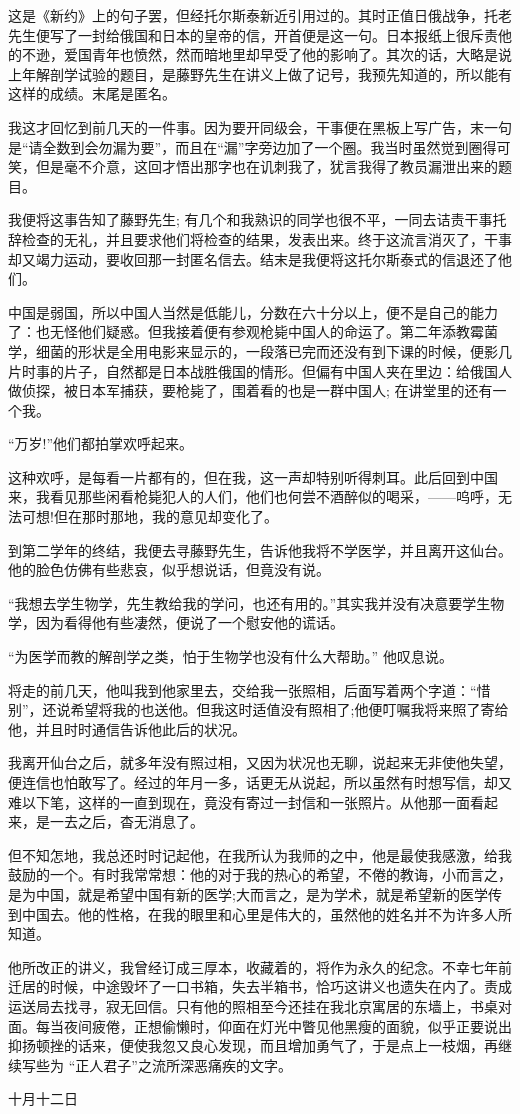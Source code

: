     这是《新约》上的句子罢，但经托尔斯泰新近引用过的。其时正值日俄战争，托老先生便写了一封给俄国和日本的皇帝的信，开首便是这一句。日本报纸上很斥责他的不逊，爱国青年也愤然，然而暗地里却早受了他的影响了。其次的话，大略是说上年解剖学试验的题目，是藤野先生在讲义上做了记号，我预先知道的，所以能有这样的成绩。末尾是匿名。

    我这才回忆到前几天的一件事。因为要开同级会，干事便在黑板上写广告，末一句是“请全数到会勿漏为要”，而且在“漏”字旁边加了一个圈。我当时虽然觉到圈得可笑，但是毫不介意，这回才悟出那字也在讥刺我了，犹言我得了教员漏泄出来的题目。

    我便将这事告知了藤野先生; 有几个和我熟识的同学也很不平，一同去诘责干事托辞检查的无礼，并且要求他们将检查的结果，发表出来。终于这流言消灭了，干事却又竭力运动，要收回那一封匿名信去。结末是我便将这托尔斯泰式的信退还了他们。

    中国是弱国，所以中国人当然是低能儿，分数在六十分以上，便不是自己的能力了：也无怪他们疑惑。但我接着便有参观枪毙中国人的命运了。第二年添教霉菌学，细菌的形状是全用电影来显示的，一段落已完而还没有到下课的时候，便影几片时事的片子，自然都是日本战胜俄国的情形。但偏有中国人夹在里边：给俄国人做侦探，被日本军捕获，要枪毙了，围着看的也是一群中国人; 在讲堂里的还有一个我。

    “万岁!”他们都拍掌欢呼起来。

    这种欢呼，是每看一片都有的，但在我，这一声却特别听得刺耳。此后回到中国来，我看见那些闲看枪毙犯人的人们，他们也何尝不酒醉似的喝采，——呜呼，无法可想!但在那时那地，我的意见却变化了。

    到第二学年的终结，我便去寻藤野先生，告诉他我将不学医学，并且离开这仙台。他的脸色仿佛有些悲哀，似乎想说话，但竟没有说。

    “我想去学生物学，先生教给我的学问，也还有用的。”其实我并没有决意要学生物学，因为看得他有些凄然，便说了一个慰安他的谎话。

    “为医学而教的解剖学之类，怕于生物学也没有什么大帮助。” 他叹息说。

    将走的前几天，他叫我到他家里去，交给我一张照相，后面写着两个字道：“惜别”，还说希望将我的也送他。但我这时适值没有照相了;他便叮嘱我将来照了寄给他，并且时时通信告诉他此后的状况。

    我离开仙台之后，就多年没有照过相，又因为状况也无聊，说起来无非使他失望，便连信也怕敢写了。经过的年月一多，话更无从说起，所以虽然有时想写信，却又难以下笔，这样的一直到现在，竟没有寄过一封信和一张照片。从他那一面看起来，是一去之后，杳无消息了。

    但不知怎地，我总还时时记起他，在我所认为我师的之中，他是最使我感激，给我鼓励的一个。有时我常常想：他的对于我的热心的希望，不倦的教诲，小而言之，是为中国，就是希望中国有新的医学;大而言之，是为学术，就是希望新的医学传到中国去。他的性格，在我的眼里和心里是伟大的，虽然他的姓名并不为许多人所知道。

    他所改正的讲义，我曾经订成三厚本，收藏着的，将作为永久的纪念。不幸七年前迁居的时候，中途毁坏了一口书箱，失去半箱书，恰巧这讲义也遗失在内了。责成运送局去找寻，寂无回信。只有他的照相至今还挂在我北京寓居的东墙上，书桌对面。每当夜间疲倦，正想偷懒时，仰面在灯光中瞥见他黑瘦的面貌，似乎正要说出抑扬顿挫的话来，便使我忽又良心发现，而且增加勇气了，于是点上一枝烟，再继续写些为 “正人君子”之流所深恶痛疾的文字。

    \hfill 十月十二日

